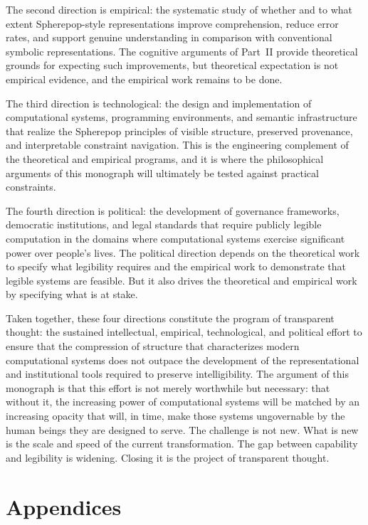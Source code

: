 \documentclass[12pt,openany]{book}
\theoremstyle{plain}
\theoremstyle{definition}
\theoremstyle{remark}
\begin{document}
The second direction is empirical: the systematic study of whether and to what extent Spherepop-style representations improve comprehension, reduce error rates, and support genuine understanding in comparison with conventional symbolic representations. The cognitive arguments of Part~II provide theoretical grounds for expecting such improvements, but theoretical expectation is not empirical evidence, and the empirical work remains to be done.

The third direction is technological: the design and implementation of computational systems, programming environments, and semantic infrastructure that realize the Spherepop principles of visible structure, preserved provenance, and interpretable constraint navigation. This is the engineering complement of the theoretical and empirical programs, and it is where the philosophical arguments of this monograph will ultimately be tested against practical constraints.

The fourth direction is political: the development of governance frameworks, democratic institutions, and legal standards that require publicly legible computation in the domains where computational systems exercise significant power over people's lives. The political direction depends on the theoretical work to specify what legibility requires and the empirical work to demonstrate that legible systems are feasible. But it also drives the theoretical and empirical work by specifying what is at stake.

Taken together, these four directions constitute the program of transparent thought: the sustained intellectual, empirical, technological, and political effort to ensure that the compression of structure that characterizes modern computational systems does not outpace the development of the representational and institutional tools required to preserve intelligibility. The argument of this monograph is that this effort is not merely worthwhile but necessary: that without it, the increasing power of computational systems will be matched by an increasing opacity that will, in time, make those systems ungovernable by the human beings they are designed to serve. The challenge is not new. What is new is the scale and speed of the current transformation. The gap between capability and legibility is widening. Closing it is the project of transparent thought.

\newpage
\section*{Appendices}
\end{document}
